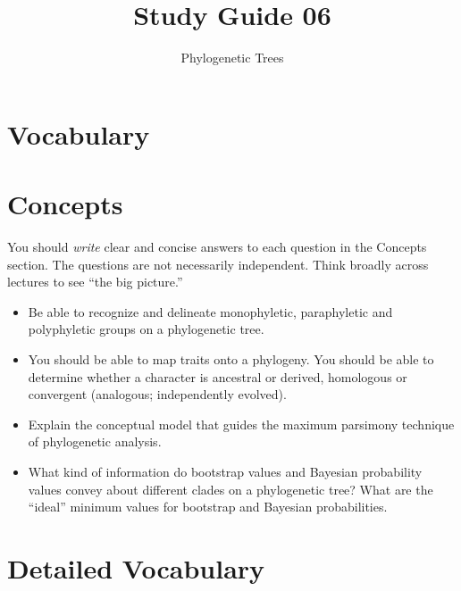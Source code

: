\documentclass[letterpaper]{tufte-handout}
\title{Study Guide 06\hfill}
\author{Phylogenetic Trees}
\date{} %
\begin{document}
\maketitle	%


\section{Vocabulary} 

\section{Concepts}

You should \emph{write} clear and concise answers to each question in the Concepts section.  The questions are not necessarily independent.  Think broadly across lectures to see ``the big picture.'' 

\begin{itemize}
	\item Be able to recognize and delineate monophyletic, paraphyletic and polyphyletic groups on a phylogenetic tree.

	\item You should be able to map traits onto a phylogeny. You should be able to determine whether a character is ancestral or derived, homologous or convergent (analogous; independently evolved).

	\item Explain the conceptual model that guides the maximum parsimony technique of phylogenetic analysis.

	\item What kind of information do bootstrap values and Bayesian probability values convey about different clades on a phylogenetic tree?  What are the ``ideal'' minimum values for bootstrap and Bayesian probabilities.

\end{itemize}

\section{Detailed Vocabulary}
\end{document}
